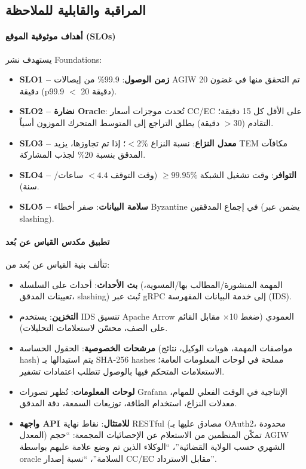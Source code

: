 \documentclass[11pt]{article}
\begin{document}
\subsection{المراقبة والقابلية للملاحظة}
\paragraph{أهداف موثوقية الموقع (SLOs)} يستهدف نشر Foundations:
\begin{itemize}[noitemsep]
  \item \textbf{SLO1 -- زمن الوصول}: 99.9\% من إيصالات AGIW تم التحقق منها في غضون 20 دقيقة (p99.9 $<$ 20 دقيقة).
  \item \textbf{SLO2 -- نضارة Oracle}: تُحدث موجزات أسعار CC/EC على الأقل كل 15 دقيقة؛ التقادم ($>30$ دقيقة) يطلق التراجع إلى المتوسط المتحرك الموزون أسياً.
  \item \textbf{SLO3 -- معدل النزاع}: نسبة النزاع $<2\%$؛ إذا تم تجاوزها، يزيد TEM مكافآت المدقق بنسبة 20\% لجذب المشاركة.
  \item \textbf{SLO4 -- التوافر}: وقت تشغيل الشبكة $\geq 99.95\%$ (وقت التوقف $<4.4$ ساعات/سنة).
  \item \textbf{SLO5 -- سلامة البيانات}: صفر أخطاء Byzantine في إجماع المدققين (يضمن عبر slashing).
\end{itemize}

\paragraph{تطبيق مكدس القياس عن بُعد} تتألف بنية القياس عن بُعد من:
\begin{itemize}[noitemsep]
  \item \textbf{بث الأحداث}: أحداث على السلسلة (المهمة المنشورة/المطالب بها/المسوية، تعيينات المدقق، slashing) تُبث عبر gRPC إلى خدمة البيانات المفهرسة (IDS).
  \item \textbf{التخزين}: يستخدم IDS تنسيق Apache Arrow العمودي (ضغط 10$\times$ مقابل القائم على الصف، محسّن لاستعلامات التحليلات).
  \item \textbf{مرشحات الخصوصية}: الحقول الحساسة (مواصفات المهمة، هويات الوكيل، نتائج hash) يتم استبدالها بـ SHA-256 hashes مملحة في لوحات المعلومات العامة؛ الاستعلامات المتحكم فيها بالوصول تتطلب اعتمادات تشفير.
  \item \textbf{لوحات المعلومات}: تُظهر تصورات Grafana الإنتاجية في الوقت الفعلي للمهام، معدلات النزاع، استخدام الطاقة، توزيعات السمعة، دقة المدقق.
  \item \textbf{واجهة API للامتثال}: نقاط نهاية RESTful (مصادق عليها بـ OAuth2، محدودة المعدل) تمكّن المنظمين من الاستعلام عن الإحصائيات المجمعة: ``حجم AGIW الشهري حسب الولاية القضائية''، ``الوكلاء الذين تم وضع علامة عليهم بواسطة oracle السلامة''، ``نسبة إصدار CC/EC مقابل الاسترداد''.
\end{itemize}
\end{document}
